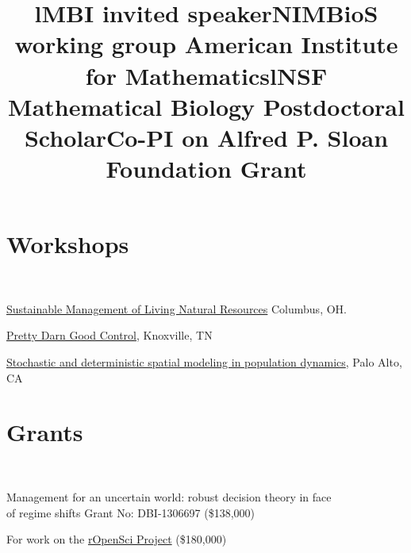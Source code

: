 \documentclass[margin]{res}
\begin{document}
\begin{resume}
\section{Workshops}
\begin{format}
\title{l} \\
\body
\end{format}

\title{MBI \textbf{invited speaker}}
\begin{position}
\href{http://www.mbi.ohio-state.edu/2013/ws3description.html}{Sustainable Management of Living Natural Resources} Columbus, OH.  
\vspace{-.25cm}
\end{position}

\title{NIMBioS working group }
\begin{position}
\href{http://www.nimbios.org/workinggroups/WG_PDG}{Pretty Darn Good Control}, Knoxville, TN  
\vspace{-.25cm}
\end{position}

\title{American Institute for Mathematics}
\begin{position}
 \href{http://www.aimath.org/WWN/populationmodel}{Stochastic and deterministic spatial modeling in population dynamics}, Palo Alto, CA  \vspace{-.25cm}
\end{position}

 
\section{Grants}
\begin{format}
\title{l} \\
\body
\end{format}

\title{\textbf{NSF} Mathematical Biology Postdoctoral Scholar}
\begin{position}
  Management for an uncertain world: robust decision theory in face \\
  of regime shifts Grant No:  DBI-1306697 (\$138,000)
  \vspace{-.25cm}
\end{position}

\title{Co-PI on \textbf{Alfred P. Sloan Foundation} Grant}
\begin{position}
  For work on the \href{http://ropensci.org}{rOpenSci Project}  (\$180,000)
  \vspace{-.25cm}
\end{position}


\end{resume}
\end{document}
